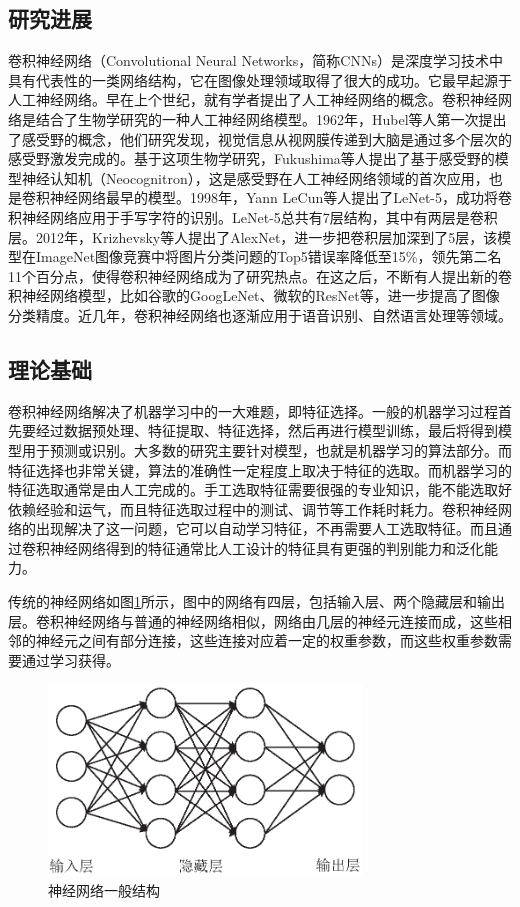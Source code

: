 \subsection{研究进展}
卷积神经网络（Convolutional Neural Networks，简称CNNs）是深度学习技术中具有代表性的一类网络结构，它在图像处理领域取得了很大的成功。它最早起源于人工神经网络。早在上个世纪，就有学者提出了人工神经网络的概念\supercite{mcculloch1943logical}。卷积神经网络是结合了生物学研究的一种人工神经网络模型。1962年，Hubel等人第一次提出了感受野的概念，他们研究发现，视觉信息从视网膜传递到大脑是通过多个层次的感受野激发完成的\supercite{hubel1962receptive}。基于这项生物学研究，Fukushima等人提出了基于感受野的模型神经认知机\supercite{fukushima1982neocognitron}（Neocognitron），这是感受野在人工神经网络领域的首次应用，也是卷积神经网络最早的模型。1998年，Yann LeCun等人提出了LeNet-5\supercite{lecun1998gradient}，成功将卷积神经网络应用于手写字符的识别。LeNet-5总共有7层结构，其中有两层是卷积层。2012年，Krizhevsky等人提出了AlexNet\supercite{krizhevsky2012imagenet}，进一步把卷积层加深到了5层，该模型在ImageNet图像竞赛中将图片分类问题的Top5错误率降低至15\%，领先第二名11个百分点，使得卷积神经网络成为了研究热点。在这之后，不断有人提出新的卷积神经网络模型，比如谷歌的GoogLeNet、微软的ResNet等，进一步提高了图像分类精度。近几年，卷积神经网络也逐渐应用于语音识别\supercite{abdel2012applying,abdel2014convolutional}、自然语言处理\supercite{collobert2011natural,zhang2015character}等领域。




\subsection{理论基础}
卷积神经网络解决了机器学习中的一大难题，即特征选择。一般的机器学习过程首先要经过数据预处理、特征提取、特征选择，然后再进行模型训练，最后将得到模型用于预测或识别。大多数的研究主要针对模型，也就是机器学习的算法部分。而特征选择也非常关键，算法的准确性一定程度上取决于特征的选取。而机器学习的特征选取通常是由人工完成的。手工选取特征需要很强的专业知识，能不能选取好依赖经验和运气，而且特征选取过程中的测试、调节等工作耗时耗力。卷积神经网络的出现解决了这一问题，它可以自动学习特征，不再需要人工选取特征。而且通过卷积神经网络得到的特征通常比人工设计的特征具有更强的判别能力和泛化能力。

传统的神经网络如图\ref{fig:24}所示，图中的网络有四层，包括输入层、两个隐藏层和输出层。卷积神经网络与普通的神经网络相似，网络由几层的神经元连接而成，这些相邻的神经元之间有部分连接，这些连接对应着一定的权重参数，而这些权重参数需要通过学习获得。
\begin{figure}[thb]
\centering
\includegraphics[height=2in]{./figures/2/2-4}
\caption{神经网络一般结构}
\label{fig:24}
\end{figure}

